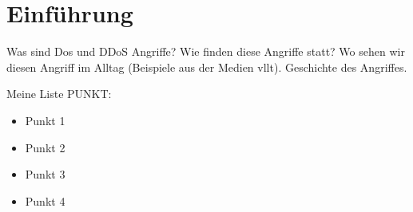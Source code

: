 \section{Einführung}

Was sind Dos und DDoS Angriffe?
Wie finden diese Angriffe statt?
Wo sehen wir diesen Angriff im Alltag (Beispiele aus der Medien vllt).
Geschichte des Angriffes.

Meine Liste PUNKT:
\begin{itemize}
    \item Punkt 1
    \item Punkt 2
    \item Punkt 3
    \item Punkt 4
\end{itemize}

